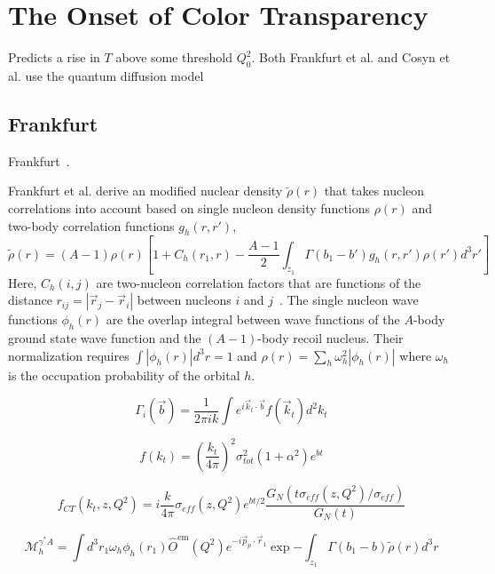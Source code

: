 \section{The Onset of Color Transparency}
Predicts a rise in $T$ above some threshold $Q^2_0$.
Both Frankfurt et al. and Cosyn et al. use the quantum diffusion model

\subsection{Frankfurt}
Frankfurt~\cite{Frankfurt_1995_PRC}.

Frankfurt et al. derive an modified nuclear density $\tilde{\rho}(r)$ that
takes nucleon correlations into account based on single nucleon density
functions $\rho(r)$ and two-body correlation functions $g_h(r,r')$,
\begin{equation}
    \tilde{\rho}(r)
        = (A-1) \rho(r)
          \left[
               1 + C_h(r_1,r) - \frac{A-1}{2} \int_{z_1} \Gamma(b_1-b')g_h(r,r')\rho(r')d^3r'
          \right]
\end{equation}
Here, $C_h(i,j)$ are two-nucleon correlation factors that are functions of the
distance $r_{ij}=|\vec{r}_j-\vec{r}_i|$ between nucleons $i$ and
$j$~\cite{Weise_1972}.
The single nucleon wave functions $\phi_h(r)$ are the overlap integral between
wave functions of the $A$-body ground state wave function and the $(A-1)$-body
recoil nucleus.
Their normalization requires $\int|\phi_h(r)|d^3r=1$ and
$\rho(r) = \sum_h \omega_h^2 \left| \phi_h(r) \right|$ where $\omega_h$ is the
occupation probability of the orbital $h$.

\begin{equation}
    \Gamma_i(\vec{b}) = \frac{1}{2\pi i k}
                  \int e^{i\vec{k}_t \cdot \vec{b}} f(\vec{k}_t) d^2k_t
\end{equation}

\begin{equation}
    f(k_t) = \left(\frac{k_t}{4\pi}\right)^2
             \sigma_{tot}^2
             (1+\alpha^2) e^{bt}
\end{equation}

\begin{equation}
    f_{CT}(k_t, z, Q^2) = i\frac{k}{4\pi} \sigma_{eff}(z,Q^2) e^{bt/2}
                          \frac{G_N\left( t \sigma_{eff}(z,Q^2)/\sigma_{eff} \right)}
                               {G_N\left( t \right)}
\end{equation}

\begin{equation}
    \mathcal{M}_{h}^{\gamma^*A} = \int d^3 r_1 \omega_h \phi_h\left(r_{1}\right)
                                  \hat{O}^{\mathrm{em}}\left(Q^{2}\right)
                                  e^{-i \vec{p}_p \cdot \vec{r}_1}
                                  \exp{- \int_{z_{1}}
                                  \Gamma\left(b_{1}-b\right) \tilde{\rho}(r) d^3 r}
\end{equation}


